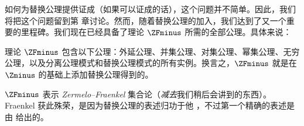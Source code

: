 \documentclass[../../../include/open-logic-section]{subfiles}
\begin{document}

如何为替换公理提供证成（如果可以证成的话），这个问题并不简单。因此，我们将把这个问题留到第  章讨论。然而，随着替换公理的加入，我们达到了又一个重要的里程碑。我们现在已经具备了理论 $\ZFminus$ 所需的全部公理。具体来说：

\begin{defn}
理论 $\ZFminus$ 包含以下公理：外延公理、并集公理、对集公理、幂集公理、无穷公理，以及分离公理模式和替换公理模式的所有实例。换言之，$\ZFminus$ 就是在 $\Zminus$ 的基础上添加替换公理得到的。
\end{defn}

\noindent
$\ZFminus$ 表示 \emph{Zermelo--Fraenkel} 集合论（\emph{减去}我们稍后会讲到的东西）。Fraenkel 获此殊荣，是因为替换公理的表述归功于他 \citeyear{Fraenkel1922}，不过第一个精确的表述是由 \citet{Skolem1922} 给出的。
\end{document}
